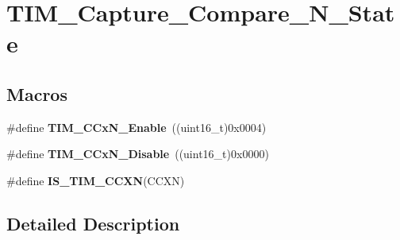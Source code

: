 \hypertarget{group___t_i_m___capture___compare___n___state}{\section{T\-I\-M\-\_\-\-Capture\-\_\-\-Compare\-\_\-\-N\-\_\-\-State}
\label{group___t_i_m___capture___compare___n___state}
}
\subsection*{Macros}
\begin{DoxyCompactItemize}
\item 
\hypertarget{group___t_i_m___capture___compare___n___state_gab534ddf23d317eb912564292c1cede2d}{\#define {\bfseries T\-I\-M\-\_\-\-C\-Cx\-N\-\_\-\-Enable}~((uint16\-\_\-t)0x0004)}\label{group___t_i_m___capture___compare___n___state_gab534ddf23d317eb912564292c1cede2d}

\item 
\hypertarget{group___t_i_m___capture___compare___n___state_ga0d7d46aeba33ed197aa39775bc527d7d}{\#define {\bfseries T\-I\-M\-\_\-\-C\-Cx\-N\-\_\-\-Disable}~((uint16\-\_\-t)0x0000)}\label{group___t_i_m___capture___compare___n___state_ga0d7d46aeba33ed197aa39775bc527d7d}

\item 
\#define {\bfseries I\-S\-\_\-\-T\-I\-M\-\_\-\-C\-C\-X\-N}(C\-C\-X\-N)
\end{DoxyCompactItemize}


\subsection{Detailed Description}


